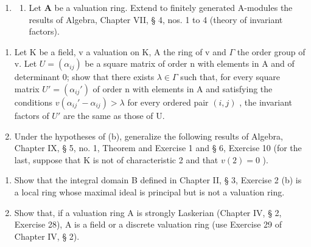 \begin{enumerate}
\def\labelenumi{\arabic{enumi}.}
\setcounter{enumi}{5}
\tightlist
\item
  \begin{enumerate}
  \def\labelenumii{(\alph{enumii})}
  \tightlist
  \item
    Let \(\mathbf{A}\) be a valuation ring. Extend to finitely generated A-modules the results of Algebra, Chapter VII, § 4, nos. 1 to 4 (theory of invariant factors).
  \end{enumerate}
\end{enumerate}

\begin{enumerate}
\def\labelenumi{(\alph{enumi})}
\setcounter{enumi}{1}
\item
  Let K be a field, v a valuation on K, A the ring of v and \(\Gamma\) the order group of v. Let \(U = (\alpha_{ij})\) be a square matrix of order n with elements in A and of determinant 0; show that there exists \(\lambda \in \Gamma\) such that, for every square matrix \(U' = (\alpha_{ij}')\) of order n with elements in A and satisfying the conditions \(v(\alpha_{ij}' - \alpha_{ij}) > \lambda\) for every ordered pair \((i,j)\) , the invariant factors of \(U'\) are the same as those of U.
\item
  Under the hypotheses of (b), generalize the following results of Algebra, Chapter IX, § 5, no. 1, Theorem and Exercise 1 and § 6, Exercise 10 (for the last, suppose that K is not of characteristic 2 and that \(v(2) = 0\) ).
\end{enumerate}

\begin{enumerate}
\def\labelenumi{\arabic{enumi}.}
\setcounter{enumi}{6}
\item
  Show that the integral domain B defined in Chapter II, § 3, Exercise 2 (b) is a local ring whose maximal ideal is principal but is not a valuation ring.
\item
  Show that, if a valuation ring A is strongly Laskerian (Chapter IV, § 2, Exercise 28), A is a field or a discrete valuation ring (use Exercise 29 of Chapter IV, § 2).
\end{enumerate}
